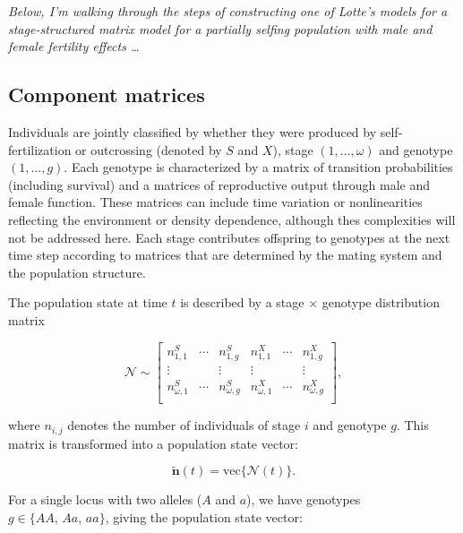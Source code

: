 \documentclass[11pt]{article}
\def\mbf#1{\mathbf{#1}}
\begin{document}
	{\itshape Below, I'm walking through the steps of constructing one of Lotte's models for a stage-structured matrix model for a partially selfing population with male and female fertility effects \ldots}
	\bigskip

\subsection{Component matrices}

\noindent Individuals are jointly classified by whether they were produced by self-fertilization or outcrossing (denoted by $S$ and $X$), stage $(1, \ldots , \omega)$ and genotype $(1, \ldots , g)$. Each genotype is characterized by a matrix of transition probabilities (including survival) and a matrices of reproductive output through male and female function. These matrices can include time variation or nonlinearities reflecting the environment or density dependence, although thes complexities will not be addressed here. Each stage contributes offspring to genotypes at the next time step according to matrices that are determined by the mating system and the population structure.

The population state at time $t$ is described by a stage $\times$ genotype distribution matrix 

\begin{equation}
	\mathcal{N} \sim \left[
						\begin{array}{ccc|ccc}
							n^S_{1,1}      &  \cdots & n^S_{1,g}       &  n^X_{1,1}      &  \cdots & n^X_{1,g} \\
							\vdots       &         & \vdots        &  \vdots       &         & \vdots  \\
							n^S_{\omega,1} &  \cdots & n^S_{\omega,g}  &  n^X_{\omega,1} &  \cdots & n^X_{\omega,g} \\
						\end{array} \right],
\end{equation}

\noindent where $n_{i,j}$ denotes the number of individuals of stage $i$ and genotype $g$. This matrix is transformed into a population state vector:

\begin{equation}
	\tilde{\mbf{n}}(t) = \text{vec}\{\mathcal{N}(t)\}.	
\end{equation}

\noindent For a single locus with two alleles ($A$ and $a$), we have genotypes $g \in \{AA,\, Aa,\, aa\}$, giving the population state vector:
\end{document}
